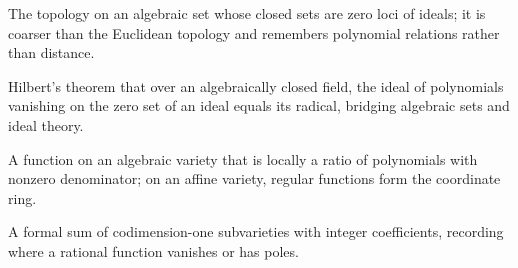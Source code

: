 \begin{description}[leftmargin=*,style=nextline,itemsep=0.3em]
\item[\textbf{Zariski topology.}] The topology on an algebraic set whose closed sets are zero loci of ideals; it is coarser than the Euclidean topology and remembers polynomial relations rather than distance.

\item[\textbf{Nullstellensatz.}] Hilbert's theorem that over an algebraically closed field, the ideal of polynomials vanishing on the zero set of an ideal equals its radical, bridging algebraic sets and ideal theory.

\item[\textbf{Regular function.}] A function on an algebraic variety that is locally a ratio of polynomials with nonzero denominator; on an affine variety, regular functions form the coordinate ring.

\item[\textbf{Divisor.}] A formal sum of codimension-one subvarieties with integer coefficients, recording where a rational function vanishes or has poles.

\end{description}

